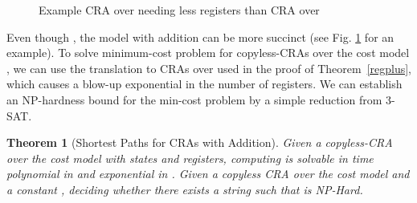 \documentclass[11pt]{article}
\newtheorem{theorem}{Theorem}
\newcommand{\nphard}{{\sc\textsc NP}-{\sc\textsc Hard}\xspace}
\begin{document}
\begin{figure}[t]
\centering
{}
\caption{Example CRA over  needing less registers than CRA
over \label{succint}}
\end{figure}



Even though , the model
with addition can be more succinct (see Fig. \ref{succint} for an
example).  To solve minimum-cost problem for copyless-CRAs over  the
cost model , we can use the translation to CRAs
over  used in the proof of Theorem~\ref{regplus},
which causes a blow-up exponential in the number of registers. We can
establish an NP-hardness bound for the min-cost problem by a simple
reduction from 3-SAT.

\begin{theorem}[Shortest Paths for CRAs with Addition]\label{ppCEDWAmcp}
Given a copyless-CRA  over the cost model  with 
states and  registers, computing  is solvable in time polynomial in  and exponential
in .  Given a copyless CRA  over the cost model  and a
constant , deciding whether there exists a string  such
that  is \nphard.
\end{theorem}
\end{document}
